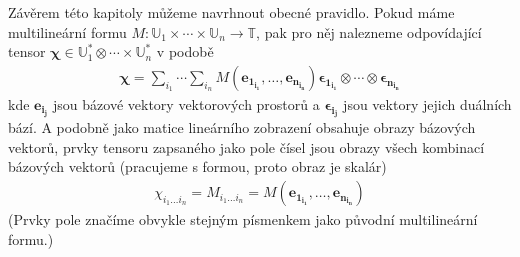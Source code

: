 \documentclass[a5paper,12pt]{amsbook}
\theoremstyle{definition}
\newcommand{\myvec}[1]{\bm{#1}}
\newcommand{\myspace}[1]{\mathbb{#1}}
\begin{document}
\medskip\noindent
Závěrem této kapitoly můžeme navrhnout obecné pravidlo. Pokud máme multilineární formu
$M: \myspace{U}_1\times\cdots\times\myspace{U}_n\rightarrow\myspace{T}$, pak pro něj
nalezneme odpovídající tensor $\myvec{\chi}\in\myspace{U}_1^*\otimes\cdots\times\myspace{U}_n^*$
v podobě
\begin{equation*}
\begin{split}
\myvec{\chi} = \sum_{i_1}\cdots\sum_{i_n}
M(\myvec{e_{1_{i_1}}}, \hdots, \myvec{e_{n_{i_n}}})
  \myvec{\epsilon_{1_{i_1}}}\otimes\cdots\otimes\myvec{\epsilon_{n_{i_n}}}
\end{split}
\end{equation*}
kde $\myvec{e_{i_j}}$ jsou bázové vektory vektorových prostorů a $\myvec{\epsilon_{i_j}}$
jsou vektory jejich duálních bází. A podobně jako matice lineárního zobrazení obsahuje
obrazy bázových vektorů, prvky tensoru zapsaného jako pole čísel jsou obrazy všech kombinací
bázových vektorů (pracujeme s formou, proto obraz je skalár)
\begin{equation*}
\begin{split}
\chi_{i_1\hdots i_n} = M_{i_1\hdots i_n} = M(\myvec{e_{1_{i_1}}}, \hdots, \myvec{e_{n_{i_n}}})
\end{split}
\end{equation*}
(Prvky pole značíme obvykle stejným písmenkem jako původní multilineární formu.)
\end{document}
